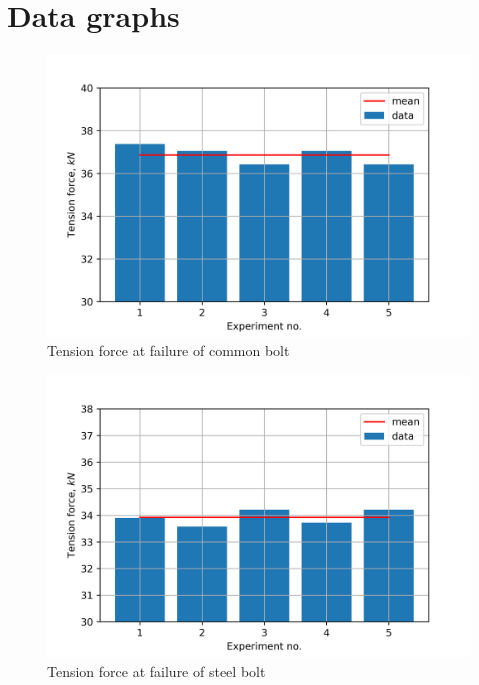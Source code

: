 \section{Data graphs}
\begin{figure}[ht]
	\centering
	\includegraphics{Exp2cb.png}
	\caption{Tension force at failure of common bolt}
\end{figure}
\begin{figure}[ht]
	\centering
	\includegraphics{Exp2sb.png}
	\caption{Tension force at failure of steel bolt}
\end{figure}